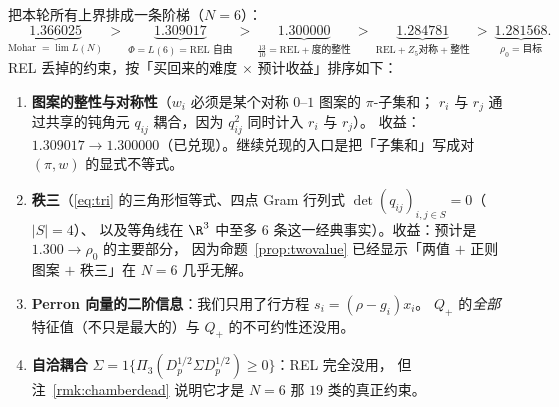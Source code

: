 把本轮所有上界排成一条阶梯（$N=6$）：
\begin{equation}\label{eq:ladder}
\underbrace{1.366025}_{\text{Mohar }=\lim L(N)}\ >\
\underbrace{1.309017}_{\Phi=L(6)=\text{REL 自由}}\ >\
\underbrace{1.300000}_{\frac{13}{10}=\text{REL}+\text{度的整性}}\ >\
\underbrace{1.284781}_{\text{REL}+Z_5\text{对称}+\text{整性}}\ >\
\underbrace{1.281568}_{\rho_0=\text{目标}} .
\end{equation}
REL 丢掉的约束，按「买回来的难度 $\times$ 预计收益」排序如下：
\begin{enumerate}[label=(\Alph*),leftmargin=2.2em]
\item \textbf{图案的整性与对称性}（$w_i$ 必须是某个对称 $0$--$1$ 图案的 $\pi$-子集和；
$r_i$ 与 $r_j$ 通过共享的钝角元 $q_{ij}$ 耦合，因为 $q_{ij}^2$ 同时计入 $r_i$ 与 $r_j$）。
收益：$1.309017\to1.300000$（已兑现）。继续兑现的入口是把「子集和」写成对 $(\pi,w)$ 的显式不等式。
\item \textbf{秩三}（\eqref{eq:tri} 的三角形恒等式、四点 Gram 行列式 $\det(q_{ij})_{i,j\in S}=0$（$|S|=4$）、
以及等角线在 $\R^3$ 中至多 $6$ 条这一经典事实）。收益：预计是 $1.300\to\rho_0$ 的主要部分，
因为命题~\ref{prop:twovalue} 已经显示「两值 $+$ 正则图案 $+$ 秩三」在 $N=6$ 几乎无解。
\item \textbf{Perron 向量的二阶信息}：我们只用了行方程 $s_i=(\rho-g_i)x_i$。
$Q_+$ 的\emph{全部}特征值（不只是最大的）与 $Q_+$ 的不可约性还没用。
\item \textbf{自洽耦合} $\Sigma=1\{\Pi_3(D_p^{1/2}\Sigma D_p^{1/2})\ge0\}$：REL 完全没用，
但注~\ref{rmk:chamberdead} 说明它才是 $N=6$ 那 $19$ 类的真正约束。
\end{enumerate}
